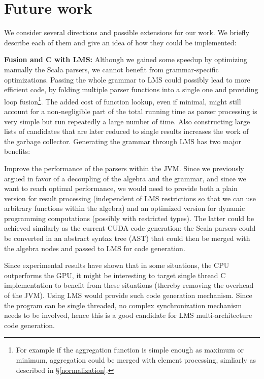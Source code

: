 \section{Future work}
We consider several directions and possible extensions for our work. We briefly describe each of them and give an idea of how they could be implemented:\ol

\item \textbf{Fusion and C with LMS:} Although we gained some speedup by optimizing manually the Scala parsers, we cannot benefit from grammar-specific optimizations. Passing the whole grammar to LMS could possibly lead to more efficient code, by folding multiple parser functions into a single one and providing loop fusion\footnote{For example if the aggregation function is simple enough as maximum or minimum, aggregation could be merged with element processing, simliarly as described in \S\ref{normalization}.}. The added cost of function lookup, even if minimal, might still account for a non-negligible part of the total running time as parser processing is very simple but run repeatedly a large number of time. Also constructing large lists of candidates that are later reduced to single results increases the work of the garbage collector. Generating the grammar through LMS has two major benefits:\ol
\item Improve the performance of the parsers within the JVM. Since we previously argued in favor of a decoupling of the algebra and the grammar, and since we want to reach optimal performance, we would need to provide both a plain version for result processing (independent of LMS restrictions so that we can use arbitrary functions within the algebra) and an optimized version for dynamic programming computations (possibly with restricted types). The latter could be achieved similarly as the current CUDA code generation: the Scala parsers could be converted in an abstract syntax tree (AST) that could then be merged with the algebra nodes and passed to LMS for code generation.
\item Since experimental results have shown that in some situations, the CPU outperforms the GPU, it might be interesting to target single thread C implementation to benefit from these situations (thereby removing the overhead of the JVM). Using LMS would provide such code generation mechanism. Since the program can be single threaded, no complex synchronization mechanism needs to be involved, hence this is a good candidate for LMS multi-architecture code generation.
